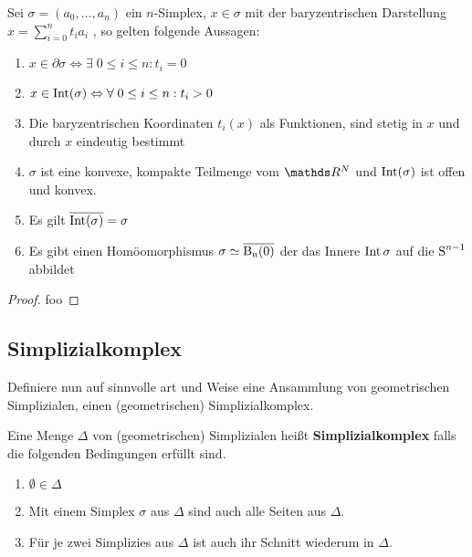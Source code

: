 \begin{Satz}
  \upshape Sei $\sigma = (a_0 , \ldots , a_n)$ ein $n$-Simplex,
  $x \in \sigma$ mit der baryzentrischen Darstellung
  $x=\sum\limits_{i=0}^n t_i a_i$ , so gelten folgende Aussagen:
  \begin{enumerate}[1)]%
  \item
    $x \in \partial\sigma \Leftrightarrow \exists \; 0 \leq i \leq n :
    t_i = 0$
  \item
    $x \in \operatorname{Int}(\sigma) \Leftrightarrow \forall \; 0 \leq i \leq n :
    t_i > 0$
  \item Die baryzentrischen Koordinaten $t_i(x)$ als Funktionen, sind
    stetig in $x$ und durch $x$ eindeutig bestimmt
  \item $\sigma$ ist eine konvexe, kompakte Teilmenge vom $\R^N$ und
    $\operatorname{Int}(\sigma)$ ist offen und konvex.
  \item Es gilt $\overline{\operatorname{Int}(\sigma)} = \sigma$
  \item Es gibt einen Homöomorphismus $\sigma \simeq \operatorname{\overline{\operatorname{B}_n(0)}}$ der das
    Innere $\operatorname{Int}{\sigma}$ auf die $\operatorname{S}^{n-1}$ abbildet
  \end{enumerate}
  \begin{proof}
    foo
  \end{proof}
\end{Satz}


\subsection{Simplizialkomplex}

Definiere nun auf sinnvolle art und Weise eine Ansammlung von
geometrischen Simplizialen, einen (geometrischen) Simplizialkomplex.

\begin{Def}
  Eine Menge $\Delta$ von (geometrischen) Simplizialen heißt
  \textbf{Simplizialkomplex} falls die folgenden Bedingungen erfüllt
  sind.
  \begin{enumerate}[1)]
  \item $\emptyset \in \Delta$
  \item Mit einem Simplex $\sigma$ aus $\Delta$ sind auch alle Seiten
    aus $\Delta$.
  \item Für je zwei Simplizies aus $\Delta$ ist auch ihr Schnitt
    wiederum in $\Delta$.
  \end{enumerate}
\end{Def}

